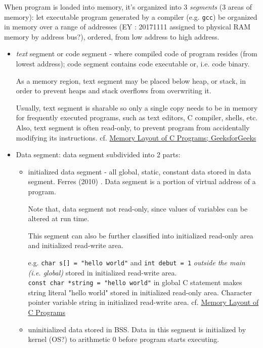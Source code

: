 \documentclass[10pt]{amsart}
\begin{document}
When program is loaded into memory, it's organized into 3 \emph{segments} (3 areas of memory):  
let executable program generated by a compiler (e.g. \verb|gcc|) be organized in memory over a range of addresses (EY : 20171111 assigned to physical RAM memory by address bus?), ordered, from low address to high address.  
\begin{itemize}
	\item \emph{text} segment or code segment - where compiled code of program resides (from lowest address); code segment contains code executable or, i.e. code binary.  
	
	As a memory region, text segment may be placed below heap, or stack, in order to prevent heaps and stack overflows from overwriting it.  
	
	Usually, text segment is sharable so only a single copy needs to be in memory for frequently executed programs, such as text editors, C compiler, shells, etc.  Also, text segment is often read-only, to prevent program from accidentally modifying its instructions.  	
	cf. \href{http://www.geeksforgeeks.org/memory-layout-of-c-program/}{Memory Layout of C Programs; GeeksforGeeks}  
	\item Data segment:  data segment subdivided into 2 parts:
	\begin{itemize}
		\item initialized data segment - all global, static, constant data stored in data segment. Ferres (2010) \cite{Ferr2010}.  Data segment is a portion of virtual address of a program.  
		
		Note that, data segment not read-only, since values of variables can be altered at run time.  
		
		This segment can also be further classified into initialized read-only area and initialized read-write area.  
		
		e.g. \verb|char s[] = "hello world"| and \verb|int debut = 1| \emph{outside the main (i.e. global)} stored in initialized read-write area.  \\
		\verb|const char *string = "hello world"| in global C statement makes string literal "hello world" stored in initialized read-only area.  Character pointer variable string in initialized read-write area.  
		cf. \href{http://www.geeksforgeeks.org/memory-layout-of-c-program/}{Memory Layout of C Programs}  
		\item uninitialized data stored in BSS.  Data in this segment is initialized by kernel (OS?) to arithmetic 0 before program starts executing.  
		

\end{itemize}
\end{itemize}
\end{document}
